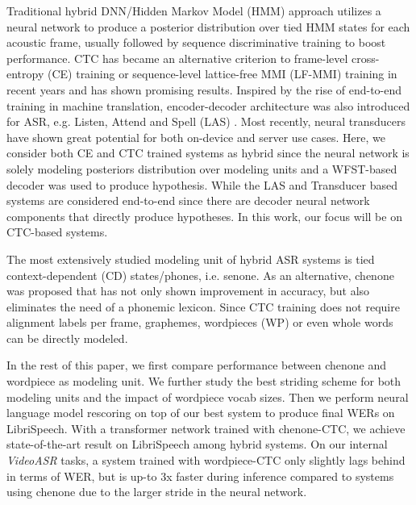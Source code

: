 \documentclass[a4paper]{article}
\begin{document}
Traditional hybrid DNN/Hidden Markov Model (HMM) approach utilizes a neural network to produce a posterior distribution over tied HMM states\cite{dahl2011large, mohamed2011acoustic} for each acoustic frame, usually followed by sequence discriminative training to boost performance\cite{povey2016purely}. CTC\cite{graves2006connectionist} has became an alternative criterion to frame-level cross-entropy (CE) training or sequence-level lattice-free MMI (LF-MMI) training in recent years and has shown promising results\cite{amodei2016deep,7404851,7178778,sak2015fast,45555}. Inspired by the rise of end-to-end training in machine translation, encoder-decoder architecture was also introduced for ASR, e.g. Listen, Attend and Spell (LAS) \cite{chan2016listen}. Most recently, neural transducers\cite{graves2012sequence} have shown great potential for both on-device\cite{sainath2020streaming} and server\cite{zhang2020transformer} use cases. Here, we consider both CE and CTC trained systems as hybrid since the neural network is solely modeling posteriors distribution over modeling units and a WFST-based decoder was used to produce hypothesis. While the LAS and Transducer based systems are considered end-to-end since there are decoder neural network components that directly produce hypotheses. In this work, our focus will be on CTC-based systems.

The most extensively studied modeling unit of hybrid ASR systems is tied context-dependent (CD) states/phones, i.e. senone\cite{dahl2011context}. As an alternative, chenone\cite{le2019senones} was proposed that has not only shown improvement in accuracy, but also eliminates the need of a phonemic lexicon. Since CTC training does not require alignment labels per frame, graphemes\cite{amodei2016deep}, wordpieces (WP)\cite{6289079,xiao2018hybrid,9003834,das2018advancing,synnaeve2019endtoend} or even whole words\cite{soltau2016neural} can be directly modeled.

In the rest of this paper, we first compare performance between chenone and wordpiece as modeling unit. We further study the best striding scheme for both modeling units and the impact of wordpiece vocab sizes. Then we perform neural language model rescoring on top of our best system to produce final WERs on LibriSpeech. With a transformer network trained with chenone-CTC, we achieve state-of-the-art result on LibriSpeech among hybrid systems. On our internal \emph{VideoASR} tasks,  a system trained with wordpiece-CTC only slightly lags behind in terms of WER, but is up-to 3x faster during inference compared to systems using chenone due to the larger stride in the neural network.
\end{document}
